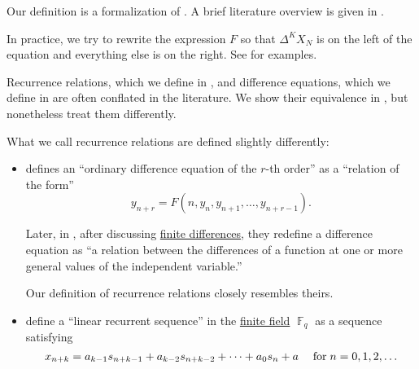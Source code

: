 \begin{comments}
  \item Our definition is a formalization of \cite[307]{Гельфонд1959ИсчислениеКонечныхРазностей}. A brief literature overview is given in .

  \item In practice, we try to rewrite the expression \( F \) so that \( \Delta^K X_N \) is on the left of the equation and everything else is on the right. See  for examples.
\end{comments}

\begin{remark}\label{rem:recurrence_relations_and_difference_equations}
  Recurrence relations, which we define in , and difference equations, which we define in  are often conflated in the literature. We show their equivalence in , but nonetheless treat them differently.

  What we call recurrence relations are defined slightly differently:
  \begin{itemize}
    \item {} defines an \enquote{ordinary difference equation of the \( r \)-th order} as a \enquote{relation of the form}
    \begin{equation*}
      y_{n+r} = F(n, y_n, y_{n+1}, \ldots, y_{n+r-1}).
    \end{equation*}

    Later, in \cite[75]{LevyLessman1961FiniteDifferenceEquations}, after discussing \hyperref[def:finite_difference_operator]{finite differences}, they redefine a difference equation as \enquote{a relation between the differences of a function at one or more general values of the independent variable.}

    Our definition of recurrence relations closely resembles theirs.

    \item {} define a \enquote{linear recurrent sequence} in the \hyperref[def:finite_field]{finite field} \( \BbbF_q \) as a sequence satisfying
    \begin{equation*}
      x_{n+k} = a_{k-1} s_{n+k-1} + a_{k-2} s_{n+k-2} + \cdots + a_0 s_n + a \quad\T{for} n = 0, 1, 2, \ldots
    \end{equation*}


\end{itemize}
\end{remark}

